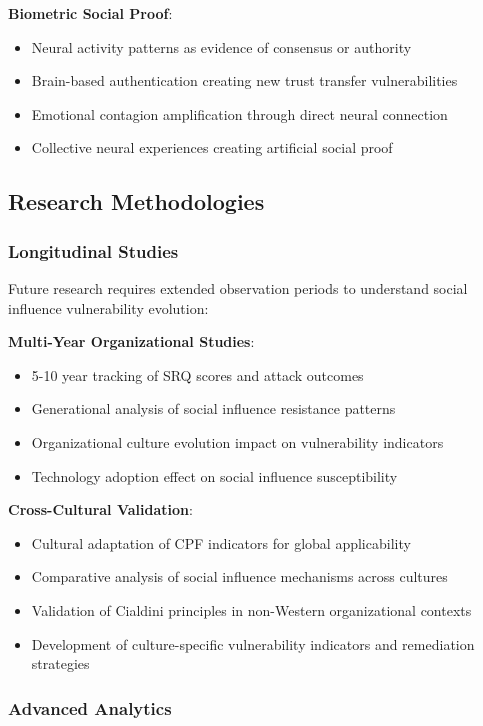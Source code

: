 \documentclass[11pt,a4paper]{article}
\begin{document}
\textbf{Biometric Social Proof}:
\begin{itemize}
\item Neural activity patterns as evidence of consensus or authority
\item Brain-based authentication creating new trust transfer vulnerabilities
\item Emotional contagion amplification through direct neural connection
\item Collective neural experiences creating artificial social proof
\end{itemize}

\subsection{Research Methodologies}

\subsubsection{Longitudinal Studies}

Future research requires extended observation periods to understand social influence vulnerability evolution:

\textbf{Multi-Year Organizational Studies}:
\begin{itemize}
\item 5-10 year tracking of SRQ scores and attack outcomes
\item Generational analysis of social influence resistance patterns
\item Organizational culture evolution impact on vulnerability indicators
\item Technology adoption effect on social influence susceptibility
\end{itemize}

\textbf{Cross-Cultural Validation}:
\begin{itemize}
\item Cultural adaptation of CPF indicators for global applicability
\item Comparative analysis of social influence mechanisms across cultures
\item Validation of Cialdini principles in non-Western organizational contexts
\item Development of culture-specific vulnerability indicators and remediation strategies
\end{itemize}

\subsubsection{Advanced Analytics}
\end{document}
